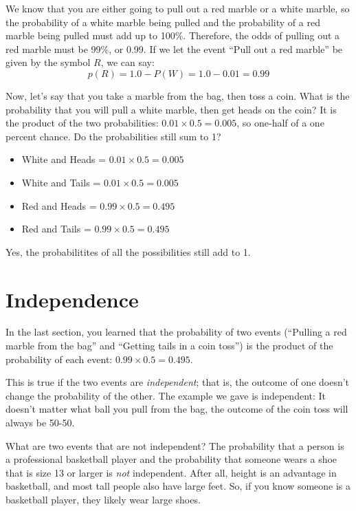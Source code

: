 We know that you are either going to pull out a red marble or a white marble,
so the probability of a white marble being pulled and the probability
of a red marble being pulled must add up to 100\%. Therefore, the odds of
pulling out a red marble must be 99\%, or 0.99. If we let the event ``Pull out a red marble'' be given by the symbol $R$, we can say:
\begin{equation*}
  p(R) = 1.0 - P(W) = 1.0 - 0.01 = 0.99
\end{equation*}

Now, let's say that you take a marble from the bag, then
toss a coin. What is the probability that you will pull a white marble, then get heads on the coin? It is the product of the two
probabilities: $0.01 \times 0.5 = 0.005$, so one-half of a one percent
chance. Do the probabilities still sum to 1?
\begin{itemize}
\item White and Heads = $0.01 \times 0.5 = 0.005$
\item White and Tails = $0.01 \times 0.5 = 0.005$
\item Red and Heads = $0.99 \times 0.5 = 0.495$
\item Red and Tails = $0.99 \times 0.5 = 0.495$
\end{itemize}
Yes, the probabilitites of all the possibilities still add to 1.

\section{Independence}

In the last section, you learned that the probability of two events
(``Pulling a red marble from the bag'' and ``Getting tails in a coin
toss'') is the product of the probability of each event: $0.99 \times 0.5 = 0.495$.

This is true if the two events are \textit{independent}; that is, the
outcome of one doesn't change the probability of the other.  The
example we gave is independent: It doesn't matter what ball you pull
from the bag, the outcome of the coin toss will always be 50-50.

What are two events that are not independent? The probability that a
person is a professional basketball player and the probability that
someone wears a shoe that is size 13 or larger is \textit{not}
independent. After all, height is an advantage in basketball, and most
tall people also have large feet. So, if you know someone is a
basketball player, they likely wear large shoes.

